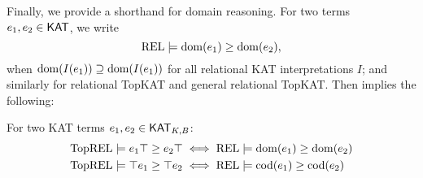 Finally, we provide a shorthand for domain reasoning. 
For two terms \(e_1, e_2  \in  \mathsf{KAT}\), we write
\[\mathbf{\mathrm{REL}}  \models  \operatorname{\mathrm{dom}}(e_1)  \geq  \operatorname{\mathrm{dom}}(e_2),\] when 
\(\operatorname{\mathrm{dom}}(I(e_1))  \supseteq  \operatorname{\mathrm{dom}}(I(e_1))\) for all relational KAT interpretations \(I\);  
and similarly for relational TopKAT and general relational TopKAT.  
Then  implies the following:
\begin{lemma}\label{the: top element represent domain}
    For two KAT terms \(e_1, e_2  \in  \mathsf{KAT}_{K, B}\):
    \begin{align*}
        \mathbf{\mathrm{TopREL}}  \models  e_1  \top   \geq  e_2  \top  &  \iff  \mathbf{\mathrm{REL}}  \models  \operatorname{\mathrm{dom}}(e_1)  \geq  \operatorname{\mathrm{dom}}(e_2) \\
        \mathbf{\mathrm{TopREL}}  \models   \top  e_1  \geq   \top  e_2 &  \iff  \mathbf{\mathrm{REL}}  \models  \operatorname{\mathrm{cod}}(e_1)  \geq  \operatorname{\mathrm{cod}}(e_2)
    \end{align*}
\end{lemma}


